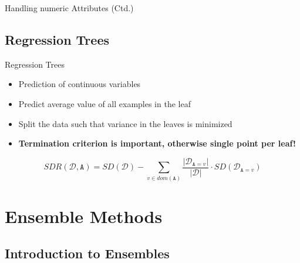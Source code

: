\begin{frame}{Handling numeric Attributes (Ctd.)}{}
	
\end{frame}


\subsection{Regression Trees}

\begin{frame}{Regression Trees}{}
	\begin{itemize}
		\item Prediction of continuous variables
		\item Predict average value of all examples in the leaf
		\item Split the data such that variance in the leaves is minimized
		\item \textbf{Termination criterion is important, otherwise single point per leaf!}
	\end{itemize}
	\begin{boxBlueNoFrame}
		\vspace*{-1mm}
		\begin{equation}
			SDR(\mathcal{D}, \texttt{A}) = SD(\mathcal{D})
				- \sum_{v \in dom(\texttt{A})} \frac{\vert \mathcal{D}_{\texttt{A}=v} \vert}{\vert \mathcal{D} \vert}
				\cdot SD(\mathcal{D}_{\texttt{A}=v})
		\end{equation}
	\end{boxBlueNoFrame}
\end{frame}


\section{Ensemble Methods}

\subsection{Introduction to Ensembles}

